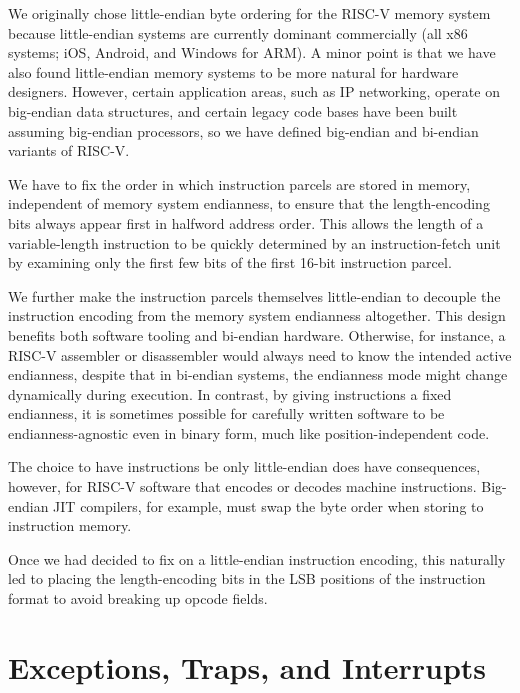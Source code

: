 \begin{commentary}
We originally chose little-endian byte ordering for the RISC-V memory system
because little-endian systems are currently dominant commercially (all
x86 systems; iOS, Android, and Windows for ARM).  A minor point is
that we have also found little-endian memory systems to be more
natural for hardware designers.  However, certain application areas,
such as IP networking, operate on big-endian data structures, and
certain legacy code bases have been built assuming big-endian
processors, so we have defined big-endian and bi-endian variants of RISC-V.

We have to fix the order in which instruction parcels are stored in
memory, independent of memory system endianness, to ensure that the
length-encoding bits always appear first in halfword address
order. This allows the length of a variable-length instruction to be
quickly determined by an instruction-fetch unit by examining only the
first few bits of the first 16-bit instruction parcel.

We further make the instruction parcels themselves little-endian to decouple
the instruction encoding from the memory system endianness altogether.
This design benefits both software tooling and bi-endian hardware.
Otherwise, for instance, a RISC-V assembler or disassembler would always need
to know the intended active endianness, despite that in bi-endian systems, the
endianness mode might change dynamically during execution.
In contrast, by giving instructions a fixed endianness, it is sometimes
possible for carefully written software to be endianness-agnostic even in
binary form, much like position-independent code.

The choice to have instructions be only little-endian does have consequences,
however, for RISC-V software that encodes or decodes machine instructions.
Big-endian JIT compilers, for example, must swap the byte order when storing
to instruction memory.

Once we had decided to fix on a little-endian instruction encoding, this
naturally led to placing the length-encoding bits in the LSB positions of the
instruction format to avoid breaking up opcode fields.
\end{commentary}

\section{Exceptions, Traps, and Interrupts}
\label{sec:trap-defn}

